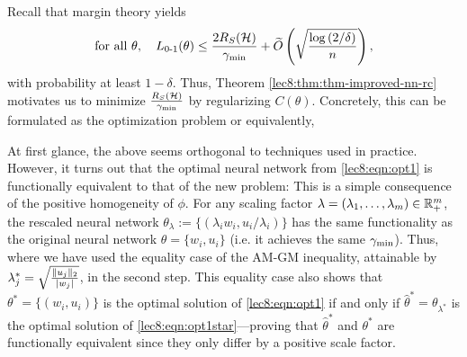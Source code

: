 Recall that margin theory yields
\begin{equation}
\text{for all } \theta, \quad L_{\textup{0-1}}(\theta) \leq \frac{2R_S(\mathcal H)}{\gamma_{\mathrm{min}}} + \widetilde{O}\left(\sqrt{\frac{\log \left( 2 / \delta \right)}{n}}\right), \label{lec8:eqn:margin-bound}
\end{equation}
with probability at least $1 -\delta$. Thus, Theorem \ref{lec8:thm:thm-improved-nn-rc} motivates us to minimize $\frac{R_S(\mathcal H)}{\gamma_{\mathrm{min}}}$ by regularizing $C(\theta)$. Concretely, this can be formulated as the optimization problem 
or equivalently,

At first glance, the above seems orthogonal to techniques used in practice. However, it turns out that the optimal neural network from \eqref{lec8:eqn:opt1} is functionally equivalent to that of the new problem:
This is a simple consequence of the positive homogeneity of $\phi$. For any scaling factor $\lambda=(\lambda_1, \dots, \lambda_m)\in \mathbb R_+^m$, the rescaled neural network $\theta_\lambda := \{(\lambda_i w_i, u_i/\lambda_i)\}$ has the same functionality as the original neural network $\theta = \{w_i, u_i \}$ (i.e. it achieves the same $\gamma_{\mathrm{min}}$). Thus, 
where we have used the equality case of the AM-GM inequality, attainable by $\lambda_j^* = \sqrt{\frac{\|u_j\|_2}{|w_j|}}$, in the second step. This equality case also shows that $\theta^* = \{(w_i, u_i ) \}$ is the optimal solution of \eqref{lec8:eqn:opt1} if and only if $\hat{\theta}^* = \theta_{\lambda^*}$ is the optimal solution of \eqref{lec8:eqn:opt1star}---proving that $\hat{\theta}^*$ and $\theta^*$ are functionally equivalent since they only differ by a positive scale factor. 

